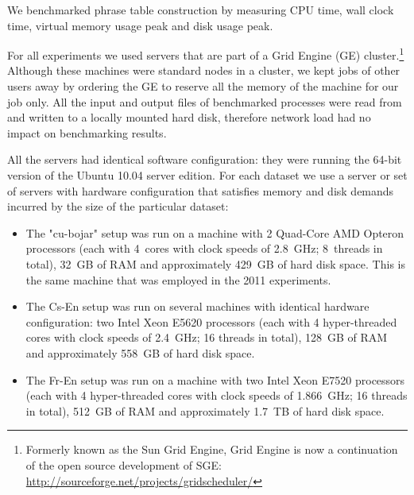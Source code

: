 We benchmarked phrase table construction by measuring CPU time, wall clock time,
virtual memory usage peak and disk usage peak.

For all experiments we used servers that are part of a Grid Engine (GE) cluster.\footnote{Formerly
known as the Sun Grid Engine, Grid Engine is now a continuation of the open source development of SGE:
\url{http://sourceforge.net/projects/gridscheduler/}}
Although these machines were standard nodes in a cluster, we kept jobs of other
users away by ordering the GE to reserve all the memory of the machine for our job only.
All the input and output files of benchmarked processes were read from and written
to a locally mounted hard disk, therefore network load had no impact on
benchmarking results.

All the servers had identical software configuration:
they were running the 64-bit version of the Ubuntu 10.04 server edition.
For each dataset we use a server or set of servers with hardware configuration
that satisfies memory and disk demands incurred by the size of the particular dataset:
\begin{itemize}
  \item The "cu-bojar" setup was run on a machine with 2 Quad-Core
  AMD Opteron\texttrademark{} processors
  (each with 4~cores with clock speeds of 2.8~GHz; 8~threads in total),
  32~GB of RAM and approximately 429~GB of hard disk space. %
  This is the same machine that was employed in the 2011 experiments.
  \item The Cs-En setup was run on several machines with identical hardware
  configuration: two Intel\textregistered{} Xeon\textregistered{} E5620
  processors
  (each with 4 hyper-threaded cores with clock speeds of 2.4~GHz; 16 threads in total),
  128~GB of RAM and approximately 558~GB of hard disk space. %
  \item The Fr-En setup was run on a machine with two Intel\textregistered{}
  Xeon\textregistered{} E7520
  processors
  (each with 4 hyper-threaded cores with clock speeds of 1.866~GHz; 16 threads in total),
  512~GB of RAM and approximately 1.7~TB of hard disk space. %
\end{itemize}

